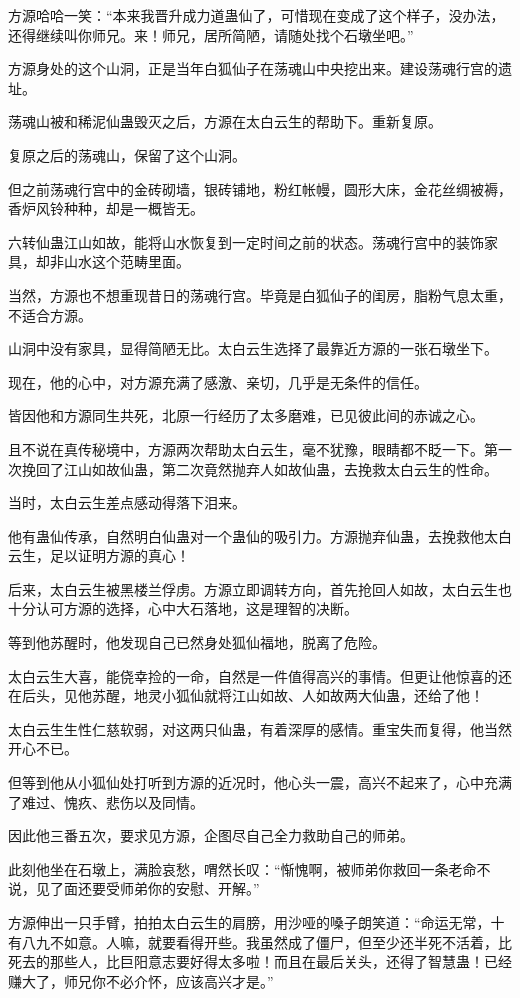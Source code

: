\begin{this_body}
方源哈哈一笑：“本来我晋升成力道蛊仙了，可惜现在变成了这个样子，没办法，还得继续叫你师兄。来！师兄，居所简陋，请随处找个石墩坐吧。”

方源身处的这个山洞，正是当年白狐仙子在荡魂山中央挖出来。建设荡魂行宫的遗址。

荡魂山被和稀泥仙蛊毁灭之后，方源在太白云生的帮助下。重新复原。

复原之后的荡魂山，保留了这个山洞。

但之前荡魂行宫中的金砖砌墙，银砖铺地，粉红帐幔，圆形大床，金花丝绸被褥，香炉风铃种种，却是一概皆无。

六转仙蛊江山如故，能将山水恢复到一定时间之前的状态。荡魂行宫中的装饰家具，却非山水这个范畴里面。

当然，方源也不想重现昔日的荡魂行宫。毕竟是白狐仙子的闺房，脂粉气息太重，不适合方源。

山洞中没有家具，显得简陋无比。太白云生选择了最靠近方源的一张石墩坐下。

现在，他的心中，对方源充满了感激、亲切，几乎是无条件的信任。

皆因他和方源同生共死，北原一行经历了太多磨难，已见彼此间的赤诚之心。

且不说在真传秘境中，方源两次帮助太白云生，毫不犹豫，眼睛都不眨一下。第一次挽回了江山如故仙蛊，第二次竟然抛弃人如故仙蛊，去挽救太白云生的性命。

当时，太白云生差点感动得落下泪来。

他有蛊仙传承，自然明白仙蛊对一个蛊仙的吸引力。方源抛弃仙蛊，去挽救他太白云生，足以证明方源的真心！

后来，太白云生被黑楼兰俘虏。方源立即调转方向，首先抢回人如故，太白云生也十分认可方源的选择，心中大石落地，这是理智的决断。

等到他苏醒时，他发现自己已然身处狐仙福地，脱离了危险。

太白云生大喜，能侥幸捡的一命，自然是一件值得高兴的事情。但更让他惊喜的还在后头，见他苏醒，地灵小狐仙就将江山如故、人如故两大仙蛊，还给了他！

太白云生生性仁慈软弱，对这两只仙蛊，有着深厚的感情。重宝失而复得，他当然开心不已。

但等到他从小狐仙处打听到方源的近况时，他心头一震，高兴不起来了，心中充满了难过、愧疚、悲伤以及同情。

因此他三番五次，要求见方源，企图尽自己全力救助自己的师弟。

此刻他坐在石墩上，满脸哀愁，喟然长叹：“惭愧啊，被师弟你救回一条老命不说，见了面还要受师弟你的安慰、开解。”

方源伸出一只手臂，拍拍太白云生的肩膀，用沙哑的嗓子朗笑道：“命运无常，十有八九不如意。人嘛，就要看得开些。我虽然成了僵尸，但至少还半死不活着，比死去的那些人，比巨阳意志要好得太多啦！而且在最后关头，还得了智慧蛊！已经赚大了，师兄你不必介怀，应该高兴才是。”


\end{this_body}
